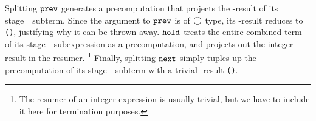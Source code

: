 \begin{abstrsyn}
Splitting ${\tt prev}$ generates a precomputation that projects the \bbone-result of its stage~\bbone\ subterm.
Since the argument to ${\tt prev}$ is of $\bigcirc$ type, its \bbone-result reduces to \texttt{()}, justifying why it can be thrown away.
${\tt hold}$ treats the entire combined term of its stage~\bbone\ subexpression as a precomputation, 
and projects out the integer result in the resumer. 
\footnote{The resumer of an integer expression is usually trivial, 
but we have to include it here for termination purposes.} 
Finally, splitting ${\tt next}$ simply tuples up the precomputation of its stage~\bbtwo\ subterm with a trivial \bbone-result \texttt{()}.

\end{abstrsyn}


